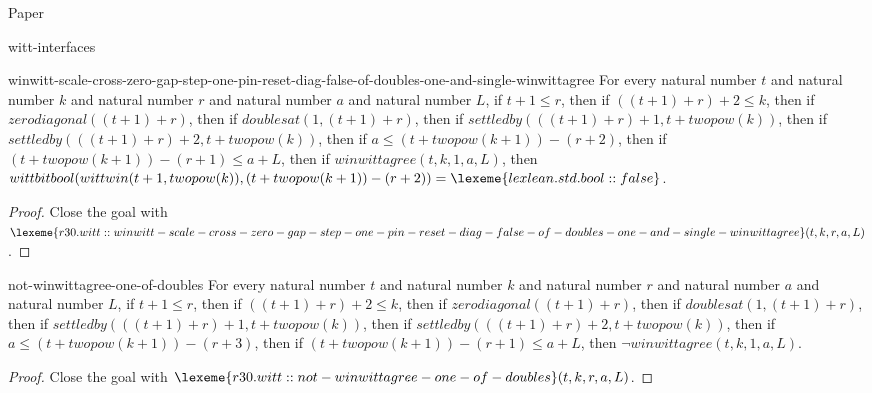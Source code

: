 \begin{lexlean}{Paper}
\begin{section}{witt-interfaces}
  \begin{theorem}{winwitt-scale-cross-zero-gap-step-one-pin-reset-diag-false-of-doubles-one-and-single-winwittagree}
  For every natural number \(t\) and natural number \(k\) and natural number \(r\) and natural number \(a\) and natural number \(L\), if \(t + 1 ≤ r\), then if \(((t + 1) + r) + 2 ≤ k\), then if \(zerodiagonal((t + 1) + r)\), then if \(doublesat(1, (t + 1) + r)\), then if \(settledby(((t + 1) + r) + 1, t + twopow(k))\), then if \(settledby(((t + 1) + r) + 2, t + twopow(k))\), then if \(a ≤ (t + twopow(k + 1)) - (r + 2)\), then if \((t + twopow(k + 1)) - (r + 1) ≤ a + L\), then if \(winwittagree(t, k, 1, a, L)\), then \(wittbitbool(wittwin(t + 1, twopow(k)), (t + twopow(k + 1)) - (r + 2)) = \lexeme{lexlean.std.bool::false}\).
  \begin{proof}
  Close the goal with \(\lexeme{r30.witt::winwitt-scale-cross-zero-gap-step-one-pin-reset-diag-false-of-doubles-one-and-single-winwittagree}(t, k, r, a, L)\).
  \end{proof}
  \end{theorem}

  \begin{theorem}{not-winwittagree-one-of-doubles}
  For every natural number \(t\) and natural number \(k\) and natural number \(r\) and natural number \(a\) and natural number \(L\), if \(t + 1 ≤ r\), then if \(((t + 1) + r) + 2 ≤ k\), then if \(zerodiagonal((t + 1) + r)\), then if \(doublesat(1, (t + 1) + r)\), then if \(settledby(((t + 1) + r) + 1, t + twopow(k))\), then if \(settledby(((t + 1) + r) + 2, t + twopow(k))\), then if \(a ≤ (t + twopow(k + 1)) - (r + 3)\), then if \((t + twopow(k + 1)) - (r + 1) ≤ a + L\), then \(¬ winwittagree(t, k, 1, a, L)\).
  \begin{proof}
  Close the goal with \(\lexeme{r30.witt::not-winwittagree-one-of-doubles}(t, k, r, a, L)\).
  \end{proof}
  \end{theorem}


\end{section}
\end{lexlean}

